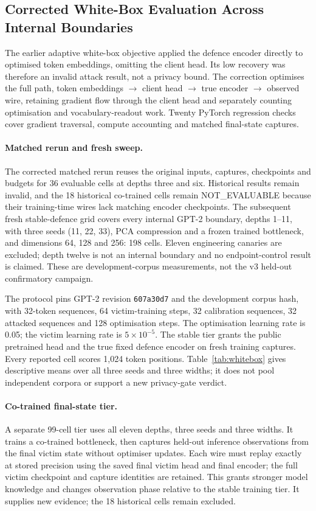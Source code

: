 \documentclass[11pt]{article}
\begin{document}
\subsection{Corrected White-Box Evaluation Across Internal Boundaries}
\label{sec:whitebox}
The earlier adaptive white-box objective applied the defence encoder directly to optimised token embeddings, omitting the client head. Its low recovery was therefore an invalid attack result, not a privacy bound. The correction optimises the full path, token embeddings $\rightarrow$ client head $\rightarrow$ true encoder $\rightarrow$ observed wire, retaining gradient flow through the client head and separately counting optimisation and vocabulary-readout work. Twenty PyTorch regression checks cover gradient traversal, compute accounting and matched final-state captures.

\paragraph{Matched rerun and fresh sweep.}
The corrected matched rerun reuses the original inputs, captures, checkpoints and budgets for 36 evaluable cells at depths three and six. Historical results remain invalid, and the 18 historical co-trained cells remain NOT\_EVALUABLE because their training-time wires lack matching encoder checkpoints. The subsequent fresh stable-defence grid covers every internal GPT-2 boundary, depths 1--11, with three seeds (11, 22, 33), PCA compression and a frozen trained bottleneck, and dimensions 64, 128 and 256: 198 cells. Eleven engineering canaries are excluded; depth twelve is not an internal boundary and no endpoint-control result is claimed. These are development-corpus measurements, not the v3 held-out confirmatory campaign.

The protocol pins GPT-2 revision \texttt{607a30d7} and the development corpus hash, with 32-token sequences, 64 victim-training steps, 32 calibration sequences, 32 attacked sequences and 128 optimisation steps. The optimisation learning rate is 0.05; the victim learning rate is $5\times10^{-5}$. The stable tier grants the public pretrained head and the true fixed defence encoder on fresh training captures. Every reported cell scores 1{,}024 token positions. Table~\ref{tab:whitebox} gives descriptive means over all three seeds and three widths; it does not pool independent corpora or support a new privacy-gate verdict.

\paragraph{Co-trained final-state tier.}
A separate 99-cell tier uses all eleven depths, three seeds and three widths. It trains a co-trained bottleneck, then captures held-out inference observations from the final victim state without optimiser updates. Each wire must replay exactly at stored precision using the saved final victim head and final encoder; the full victim checkpoint and capture identities are retained. This grants stronger model knowledge and changes observation phase relative to the stable training tier. It supplies new evidence; the 18 historical cells remain excluded.
\end{document}
